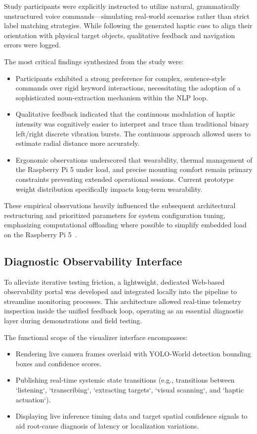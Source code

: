 \documentclass{article}
\begin{document}
Study participants were explicitly instructed to utilize natural, grammatically unstructured voice commands—simulating real-world scenarios rather than strict label matching strategies. While following the generated haptic cues to align their orientation with physical target objects, qualitative feedback and navigation errors were logged.

The most critical findings synthesized from the study were:
\begin{itemize}
    \item Participants exhibited a strong preference for complex, sentence-style commands over rigid keyword interactions, necessitating the adoption of a sophisticated noun-extraction mechanism within the NLP loop.
    \item Qualitative feedback indicated that the continuous modulation of haptic intensity was cognitively easier to interpret and trace than traditional binary left/right discrete vibration bursts. The continuous approach allowed users to estimate radial distance more accurately.
    \item Ergonomic observations underscored that wearability, thermal management of the Raspberry Pi 5 under load, and precise mounting comfort remain primary constraints preventing extended operational sessions. Current prototype weight distribution specifically impacts long-term wearability.
\end{itemize}

These empirical observations heavily influenced the subsequent architectural restructuring and prioritized parameters for system configuration tuning, emphasizing computational offloading where possible to simplify embedded load on the Raspberry Pi 5~\cite{rpi5}.

\subsection{Diagnostic Observability Interface}

To alleviate iterative testing friction, a lightweight, dedicated Web-based observability portal was developed and integrated locally into the pipeline to streamline monitoring processes. This architecture allowed real-time telemetry inspection inside the unified feedback loop, operating as an essential diagnostic layer during demonstrations and field testing.

The functional scope of the visualizer interface encompasses:
\begin{itemize}
    \item Rendering live camera frames overlaid with YOLO-World detection bounding boxes and confidence scores.
    \item Publishing real-time systemic state transitions (e.g., transitions between `listening`, `transcribing`, `extracting targets`, `visual scanning`, and `haptic actuation`). 
    \item Displaying live inference timing data and target spatial confidence signals to aid root-cause diagnosis of latency or localization variations.
\end{itemize}
\end{document}
